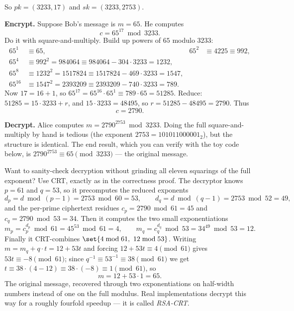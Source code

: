 So $pk = (3233, 17)$ and $sk = (3233, 2753)$.

\textbf{Encrypt.} Suppose Bob's message is $m = 65$. He computes
\[
  c = 65^{17}\bmod 3233.
\]
Do it with square-and-multiply. Build up powers of $65$ modulo $3233$:
\[
\begin{aligned}
  65^1 &\equiv 65, &
  65^2 &\equiv 4225 \equiv 992, \\
  65^4 &\equiv 992^2 = 984064 \equiv 984064 - 304\cdot 3233 = 1232, \\
  65^8 &\equiv 1232^2 = 1517824 \equiv 1517824 - 469\cdot 3233 = 1547, \\
  65^{16} &\equiv 1547^2 = 2393209 \equiv 2393209 - 740\cdot 3233 = 789.
\end{aligned}
\]
Now $17 = 16 + 1$, so $65^{17} = 65^{16}\cdot 65^{1} \equiv 789\cdot 65 = 51285$. Reduce: $51285 = 15\cdot 3233 + r$, and $15\cdot 3233 = 48495$, so $r = 51285-48495 = 2790$. Thus
\[
  c = 2790.
\]

\textbf{Decrypt.} Alice computes $m = 2790^{2753}\bmod 3233$. Doing the full square-and-multiply by hand is tedious (the exponent $2753 = 101011000001_2$), but the structure is identical. The end result, which you can verify with the toy code below, is $2790^{2753}\equiv 65\pmod{3233}$ --- the original message.

\begin{walkbox}
Want to sanity-check decryption without grinding all eleven squarings of the full exponent? Use CRT, exactly as in the correctness proof. The decryptor knows $p=61$ and $q=53$, so it precomputes the reduced exponents
\[
  d_p = d\bmod(p-1) = 2753\bmod 60 = 53, \qquad
  d_q = d\bmod(q-1) = 2753\bmod 52 = 49,
\]
and the per-prime ciphertext residues $c_p = 2790\bmod 61 = 45$ and $c_q = 2790\bmod 53 = 34$. Then it computes the two small exponentiations
\[
  m_p = c_p^{d_p}\bmod 61 = 45^{53}\bmod 61 = 4, \qquad
  m_q = c_q^{d_q}\bmod 53 = 34^{49}\bmod 53 = 12.
\]
Finally it CRT-combines $\set{4\bmod 61,\ 12\bmod 53}$. Writing $m = m_q + q\cdot t = 12 + 53t$ and forcing $12+53t\equiv 4\pmod{61}$ gives $53t\equiv -8\pmod{61}$; since $q^{-1}\equiv 53^{-1}\equiv 38\pmod{61}$ we get $t \equiv 38\cdot(4-12)\equiv 38\cdot(-8)\equiv 1\pmod{61}$, so
\[
  m = 12 + 53\cdot 1 = 65.
\]
The original message, recovered through two exponentiations on half-width numbers instead of one on the full modulus. Real implementations decrypt this way for a roughly fourfold speedup --- it is called \emph{RSA-CRT}.
\end{walkbox}

